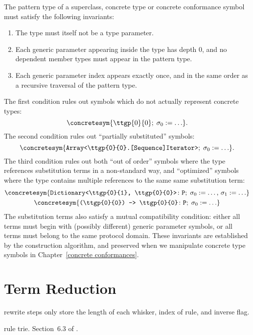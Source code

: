 \documentclass[../generics]{subfiles}
\begin{document}
The pattern type of a superclass, concrete type or concrete conformance symbol must satisfy the following invariants:
\begin{enumerate}
\item The type must itself not be a type parameter.
\item Each generic parameter appearing inside the type has depth 0, and no dependent member types must appear in the pattern type.
\item Each generic parameter index appears exactly once, and in the same order as a recursive traversal of the pattern type.
\end{enumerate}
The first condition rules out symbols which do not actually represent concrete types:
\[\concretesym{\ttgp{0}{0};\; \sigma_0 := \ldots}.\]
The second condition rules out ``partially substituted'' symbols:
\[\concretesym{\texttt{Array<\ttgp{0}{0}.[Sequence]Iterator>};\; \sigma_0 := \ldots}.\]
The third condition rules out both ``out of order'' symbols where the type references substitution terms in a non-standard way, and ``optimized'' symbols where the type contains multiple references to the same same substitution term:
\begin{gather*}
\concretesym{\texttt{Dictionary<\ttgp{0}{1}, \ttgp{0}{0}>}\colon\texttt{P};\;\sigma_0 := \ldots,\, \sigma_1 := \ldots}\\
\concretesym{\texttt{(\ttgp{0}{0}) -> \ttgp{0}{0}}\colon\texttt{P};\;\sigma_0 := \ldots}
\end{gather*}
The substitution terms also satisfy a mutual compatibility condition: either all terms must begin with (possibly different) generic parameter symbols, or all terms must belong to the same protocol domain. These invariants are established by the construction algorithm, and preserved when we manipulate concrete type symbols in Chapter~\ref{concrete conformances}.

\section{Term Reduction}\label{term reduction}


rewrite steps only store the length of each whisker, index of rule, and inverse flag.

rule trie. Section~6.3 of \cite{art3}.

\begin{algorithm}\label{trie insert algo}
\end{algorithm}
\end{document}
